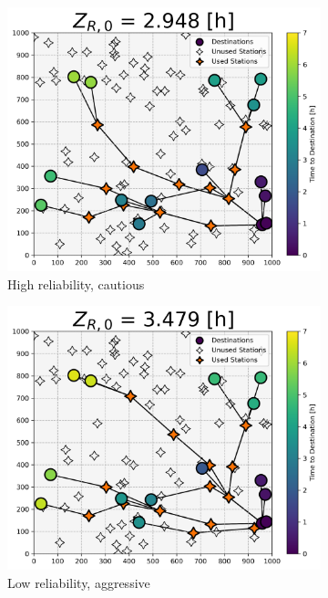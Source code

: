 \begin{figure}[H]
\begin{subfigure}[t]{.5\linewidth}
		\includegraphics[width = \linewidth]{figs/random_example_high_reliability_cautious_actual.png}
		\caption{High reliability, cautious}
	\end{subfigure}
	\begin{subfigure}[t]{.5\linewidth}
		\centering\captionsetup{width = .8\linewidth}
		\includegraphics[width = \linewidth]{figs/random_example_low_reliability_aggressive_actual.png}
		\caption{Low reliability, aggressive}
	\end{subfigure}%
	\begin{subfigure}[t]{.5\linewidth}

\end{subfigure}
\end{figure}
